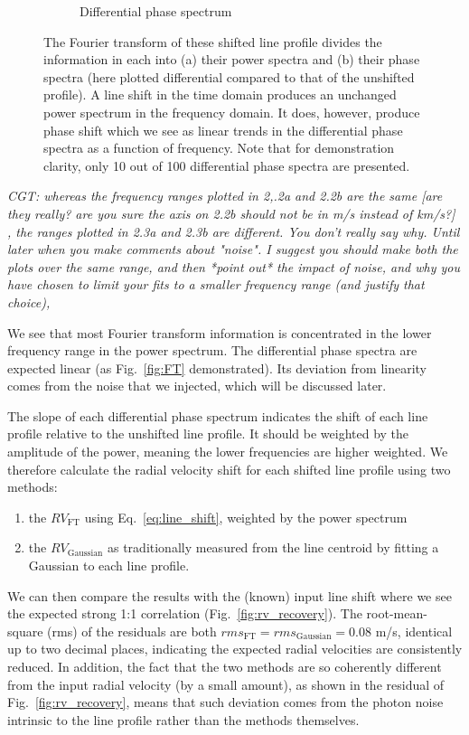 \begin{figure}[tbp]
\begin{subfigure}[b]{0.49\textwidth}
        \caption{Differential phase spectrum}
        \label{fig:dps}
    \end{subfigure}	
    \caption[Fourier transform of 100 shifted line profiles]
    {The Fourier transform of these shifted line profile divides the information in each into (a) their power spectra and (b) their phase spectra (here plotted differential compared to that of the unshifted profile). A line shift in the time domain produces an unchanged power spectrum in the frequency domain. It does, however, produce phase shift which we see as linear trends in the differential phase spectra as a function of frequency. Note that for demonstration clarity, only 10 out of 100 differential phase spectra are presented.}
\label{fig:FT_process}
\end{figure}    

{\em CGT: whereas the frequency ranges plotted in 2,.2a and 2.2b are the same [are they really? are you sure the axis on 2.2b should not be in m/s instead of km/s?]
, the ranges plotted in 2.3a and 2.3b are different. You don't really say why. Until later when you make comments about "noise".
I suggest you should make both the plots over the same range, and then *point out* the impact of noise,
and why you have chosen to limit your fits to a smaller frequency range (and justify that choice),}

We see that most Fourier transform information is concentrated in the lower frequency range in the power spectrum.
The differential phase spectra are expected linear (as Fig.~\ref{fig:FT} demonstrated). Its deviation from linearity 
comes from the noise that we injected, which will be discussed later. 

The slope of each differential phase spectrum indicates the shift of each line profile relative to 
the unshifted line profile. It should be weighted by the amplitude of the power, meaning the lower frequencies 
are higher weighted. We therefore calculate the radial velocity shift for each shifted line profile
using two methods: 
\begin{enumerate}
	\item the $RV_\text{FT}$ using Eq.~\ref{eq:line_shift}, weighted by the power spectrum
	\item the $RV_\text{Gaussian}$ as traditionally measured from the line centroid by fitting a Gaussian to each line profile.
\end{enumerate}
We can then compare the results with the (known) input line shift where we see the expected strong 1:1 correlation (Fig.~\ref{fig:rv_recovery}). The root-mean-square (rms) of the residuals are both $rms_\text{FT} = rms_\text{Gaussian} = 0.08$ m/s, identical up to two decimal places, indicating the expected radial velocities are consistently reduced. In addition, the fact that the two methods are so coherently different from the input radial velocity (by a small amount), as shown in the residual of Fig.~\ref{fig:rv_recovery}, means that such deviation comes from the photon noise intrinsic to the line profile rather than the methods themselves. 

